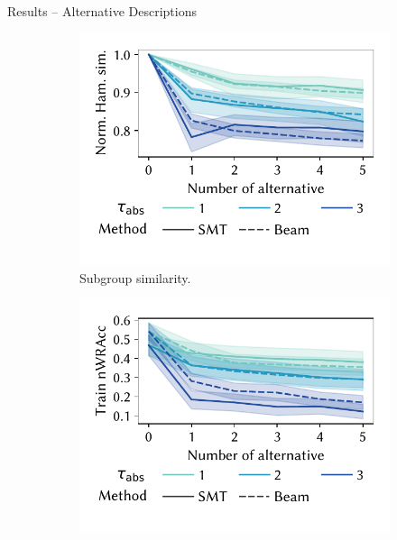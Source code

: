 \documentclass[en, navbaroff]{sdqbeamer}
\begin{document}
\begin{frame}[t]{Results -- Alternative Descriptions}
	\begin{figure}
		\centering
		\begin{subfigure}[t]{0.4\textwidth}
			\centering
			\includegraphics[width=\textwidth, trim=10 25 10 10, clip]{plots/csd-alternatives-hamming.pdf}
			\caption{Subgroup similarity.}
			\label{fig:csd:alternatives-hamming}
		\end{subfigure}
		\hspace{\kitcolumnsep}
		\begin{subfigure}[t]{0.4\textwidth}
			\centering
			\includegraphics[width=\textwidth, trim=10 25 10 10, clip]{plots/csd-alternatives-train-nwracc.pdf}

\end{subfigure}
\end{figure}
\end{frame}
\end{document}
